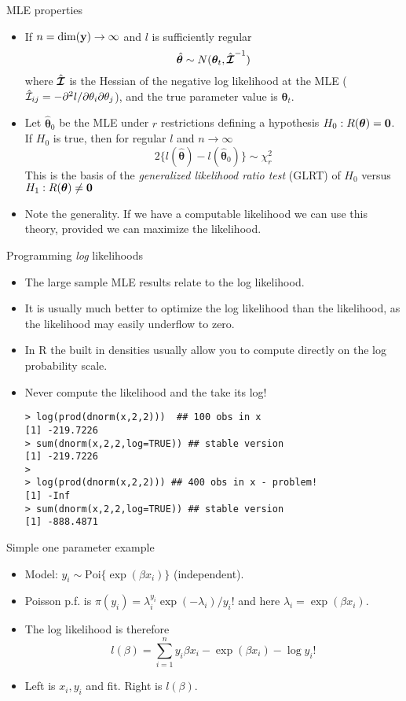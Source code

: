 \documentclass{beamer}
\newcommand{\ilpddif}[3]{\partial^2 #1/{\partial #2 \partial #3}}
\newcommand{\eps}[3]
{{\begin{center}
 \rotatebox{#1}{\scalebox{#2}{\texttt{[image: \#3]}}}
 \end{center}}
}
\begin{document}
\begin{frame}{MLE properties}
\begin{itemize}
\item If $n=\text{dim}({\bf y}) \to \infty$ and $l$ is sufficiently regular
$$
\hat {\bm \theta} \sim N({\bm \theta}_t,\hat{\bm{{\cal I}}}^{-1})
$$
where $\hat{\bm{{\cal I}}} $ is the Hessian of the negative log likelihood at the MLE ($\hat {\cal I}_{ij} = -\ilpddif{l}{\theta_i}{\theta_j}$), and the true parameter value is ${\bm \theta}_t$.
\item Let $\hat {\bm \theta}_0$ be the MLE under $r$ restrictions defining a hypothesis $H_0:R({\bm \theta}) = {\bf 0}$. If $H_0$ is true, then for regular $l$ and $n \to \infty$
$$
2 \{l(\hat {\bm \theta}) - l(\hat {\bm \theta}_0)\} \sim \chi^2_r
$$
This is the basis of the {\em generalized likelihood ratio test} (GLRT) of $H_0$ versus $H_1:R({\bm \theta}) \ne {\bf 0}$ 
\item Note the generality. If we have a computable likelihood we can use this theory, provided we can maximize the likelihood. 
\end{itemize}
\end{frame}

\begin{frame}[fragile]{Programming {\em log} likelihoods}
\begin{itemize}
\item The large sample MLE results relate to the log likelihood.
\item It is usually much better to optimize the log likelihood than the likelihood, as the likelihood may easily underflow to zero. 
\item In R the built in densities usually allow you to compute directly on the log probability scale.
\item Never compute the likelihood and the take its log!
{\scriptsize \begin{verbatim}
> log(prod(dnorm(x,2,2)))  ## 100 obs in x
[1] -219.7226
> sum(dnorm(x,2,2,log=TRUE)) ## stable version
[1] -219.7226
> 
> log(prod(dnorm(x,2,2))) ## 400 obs in x - problem!
[1] -Inf
> sum(dnorm(x,2,2,log=TRUE)) ## stable version
[1] -888.4871
\end{verbatim}}  
\end{itemize} 
\end{frame}

\begin{frame}{Simple one parameter example}
\begin{itemize}
\item Model: $ y_i \sim \text{Poi}\{\exp(\beta x_i)\}$ (independent).
\item Poisson p.f. is $\pi(y_i) = \lambda_i^{y_i} \exp(-\lambda_i)/y_i!$ and here $\lambda_i = \exp(\beta x_i)$.
\item The log likelihood is therefore
$$
l(\beta) = \sum_{i=1}^n y_i \beta x_i - \exp(\beta x_i) - \log y_i!
$$
\item Left is $x_i, y_i$ and fit. Right is $l(\beta)$.
\end{itemize}
\eps{0}{.3}{fig-likelihood-fig-1.pdf}
\end{frame}
\end{document}
